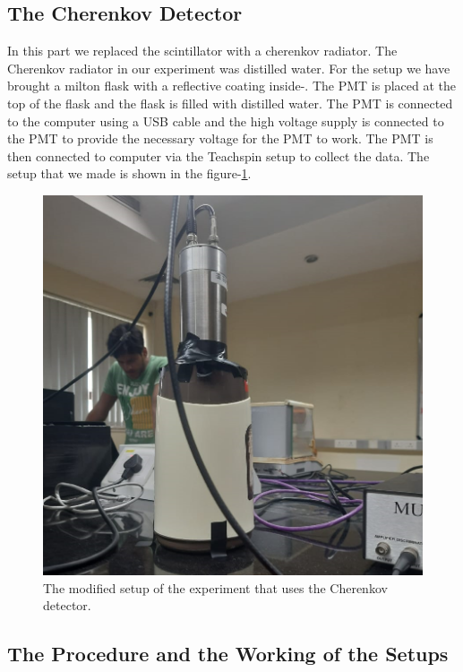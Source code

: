 \documentclass{article}
\begin{document}
\begin{multicols}{2}
\subsection{The Cherenkov Detector}

In this part we replaced the scintillator with a cherenkov radiator. The Cherenkov radiator in our experiment was distilled water. For the setup we have brought a milton flask with a reflective coating inside-\cite{diy}. The PMT is placed at the top of the flask and the flask is filled with distilled water. The PMT is connected to the computer using a USB cable and the high voltage supply is connected to the PMT to provide the necessary voltage for the PMT to work. The PMT is then connected to computer via the Teachspin setup to collect the data. The setup that we made is shown in the figure-\ref{cherenkovsetup}.


\begin{figure}[H]
    \centering
    \includegraphics[width = \columnwidth]{Images/cherenkovsetup.png}
    \caption{The modified setup of the experiment that uses the Cherenkov detector.}
    \label{cherenkovsetup}
\end{figure}


\subsection{The Procedure and the Working of the Setups}


\end{multicols}
\end{document}
